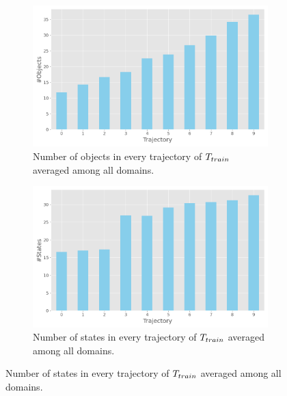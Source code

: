 
\begin{figure}[ht]
  \centering

  \begin{subfigure}[b]{0.48\textwidth}
    \includegraphics[width=\textwidth]{figures/10_traces/objects.png}
    \caption{Number of objects in every trajectory of $T_{train}$ averaged among all domains.}
  \end{subfigure}
  \hfill
  \begin{subfigure}[b]{0.48\textwidth}
    \includegraphics[width=\textwidth]{figures/10_traces/states.png}
    \caption{Number of states in every trajectory of $T_{train}$ averaged among all domains.}
  \end{subfigure}
  
\end{figure} 